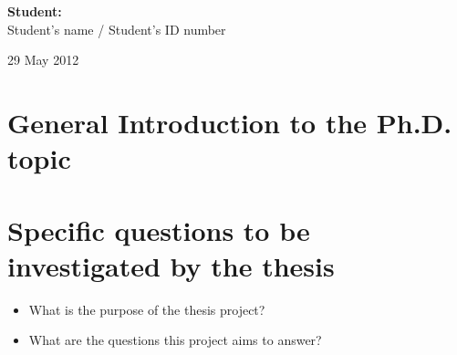 \documentclass[useAMS,usenatbib,onecolumn]{mnras}
\begin{document}
\begin{flushright}
{\bf Student:}\\
Student's name / Student's ID number
\end{flushright}\hspace{8cm}


\begin{center}
29 May 2012
\end{center}
\newpage

\date{Date of the review}

\section{General Introduction to the Ph.D. topic}
\label{sec:introduction}

\section{Specific questions to be investigated by the thesis}
\label{sec:thesis}

\begin{itemize}
  \item{What is the purpose of the thesis project?}
	\item{What are the questions this project aims to answer?}
\end{itemize}

\end{document}
